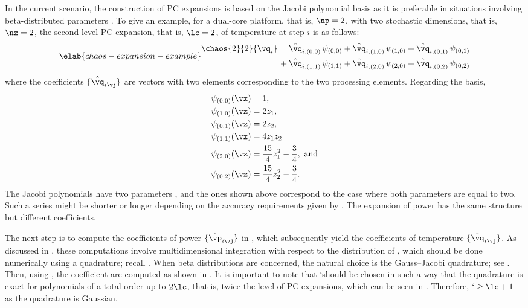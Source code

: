 In the current scenario, the construction of \ac{PC} expansions is based on the
Jacobi polynomial basis as it is preferable in situations involving
beta-distributed parameters \cite{xiu2010}. To give an example, for a dual-core
platform, that is, $\np = 2$, with two stochastic dimensions, that is, $\nz =
2$, the second-level \ac{PC} expansion, that is, $\lc = 2$, of temperature at
step $i$ is as follows:
\begin{equation} \elab{chaos-expansion-example}
  \begin{split}
    \chaos{2}{2}{\vq_i}
    =    {} & \hat{\vq}_{i, (0, 0)} \, \psi_{(0, 0)} +
              \hat{\vq}_{i, (1, 0)} \, \psi_{(1, 0)} +
              \hat{\vq}_{i, (0, 1)} \, \psi_{(0, 1)} \\
    {} + {} & \hat{\vq}_{i, (1, 1)} \, \psi_{(1, 1)} +
              \hat{\vq}_{i, (2, 0)} \, \psi_{(2, 0)} +
              \hat{\vq}_{i, (0, 2)} \, \psi_{(0, 2)}
  \end{split}
\end{equation}
where the coefficients $\{ \hat{\vq}_{i \vj} \}$ are vectors with two elements
corresponding to the two processing elements. Regarding the basis,
\begin{align*}
  & \psi_{(0, 0)}(\vz) = 1, \\
  & \psi_{(1, 0)}(\vz) = 2 z_1, \\
  & \psi_{(0, 1)}(\vz) = 2 z_2, \\
  & \psi_{(1, 1)}(\vz) = 4 z_1 z_2 \\
  & \psi_{(2, 0)}(\vz) = \frac{15}{4} z_1^2 - \frac{3}{4}, \text{ and} \\
  & \psi_{(0, 2)}(\vz) = \frac{15}{4} z_2^2 - \frac{3}{4}.
\end{align*}
The Jacobi polynomials have two parameters \cite{xiu2010}, and the ones shown
above correspond to the case where both parameters are equal to two. Such a
series might be shorter or longer depending on the accuracy requirements given
by \lc. The expansion of power has the same structure but different
coefficients.

The next step is to compute the coefficients of power $\{ \hat{\vp}_{i \vj} \}$
in , which subsequently yield the coefficients of
temperature $\{ \hat{\vq}_{i \vj} \}$. As discussed in ,
these computations involve multidimensional integration with respect to the
distribution of \vz, which should be done numerically using a quadrature; recall
. When beta distributions are concerned, the natural
choice is the Gauss--Jacobi quadrature; see . Then,
using , the coefficient are computed as shown in
. It is important to note that \lq should be chosen in
such a way that the quadrature is exact for polynomials of a total order up to
$2 \lc$, that is, twice the level of \ac{PC} expansions, which can be seen in
 \cite{eldred2008}. Therefore, $\lq \geq \lc + 1$ as the
quadrature is Gaussian.

